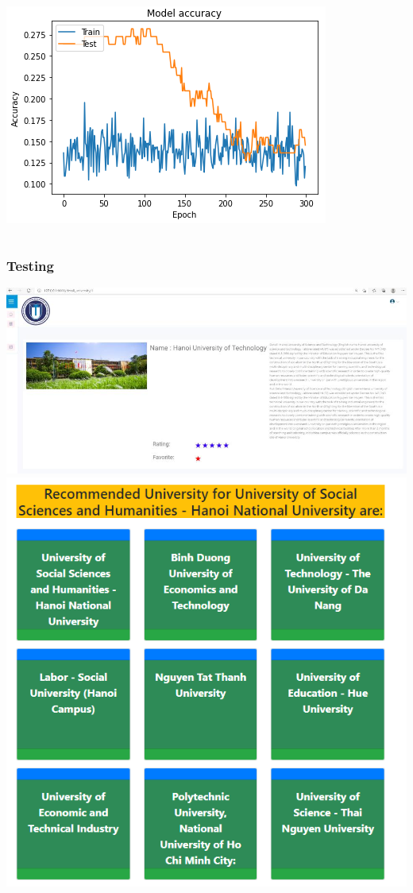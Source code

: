 \documentclass[10pt,dvipsnames]{beamer}
\begin{document}
\begin{frame}
\begin{columns}
\begin{column}{0.5\linewidth}
      \includegraphics[width=\linewidth]{pics/accuracy.png}
    \end{column}
  \end{columns}

\end{frame}

\begin{frame}
  \frametitle{Testing}
  \centering
  \includegraphics[width=0.7\linewidth]{pics/1-rating.png}
  \vspace{1em}
  \includegraphics[width=0.5\linewidth]{pics/1-example.png}

\end{frame}
\end{document}
